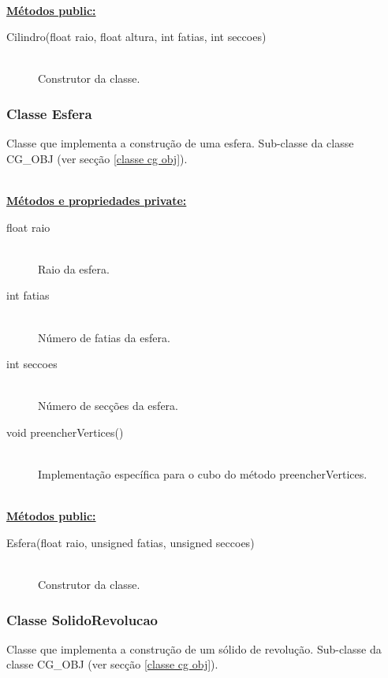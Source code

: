 \documentclass[a5paper,onecolumn, 11pt]{article}
\begin{document}
\hfill \\ \underline{\textbf{Métodos public:}}

\begin{description}
	\item[Cilindro(float raio, float altura, int fatias, int seccoes)] \hfill \\
	Construtor da classe.
\end{description}

\clearpage
\subsubsection{Classe Esfera} \label{classe esfera}
Classe que implementa a construção de uma esfera. Sub-classe da classe CG\_OBJ (ver secção \ref{classe cg obj}).

\hfill \\ \underline{\textbf{Métodos e propriedades private:}}

\begin{description}
	\item[float raio] \hfill \\
	Raio da esfera.

	\item[int fatias] \hfill \\
	Número de fatias da esfera.

	\item[int seccoes] \hfill \\
	Número de secções da esfera.

	\item[void preencherVertices()] \hfill \\
	Implementação específica para o cubo do método preencherVertices.
\end{description}

\hfill \\ \underline{\textbf{Métodos public:}}

\begin{description}
	\item[Esfera(float raio, unsigned fatias, unsigned seccoes)] \hfill \\
	Construtor da classe.
\end{description}

\clearpage
\subsubsection{Classe SolidoRevolucao} \label{classe solidorevolucao}
Classe que implementa a construção de um sólido de revolução. Sub-classe da classe CG\_OBJ (ver secção \ref{classe cg obj}).
\end{document}
